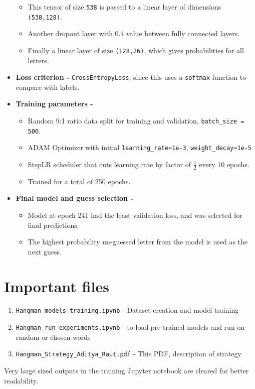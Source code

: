 \documentclass{article}
\begin{document}
\begin{itemize}
\begin{itemize}
		\item This tensor of size \texttt{538} is passed to a linear layer of dimensions \texttt{(538,128)}.
		\item Another dropout layer with 0.4 value between fully connected layers.
		\item Finally a linear layer of size \texttt{(128,26)}, which gives probabilities for all letters.
	\end{itemize}
	\item \textbf{Loss criterion -} \texttt{CrossEntropyLoss}, since this uses a \texttt{softmax} function to compare with labels.
	\item \textbf{Training parameters -}
	\begin{itemize}
		
		\item Random 9:1 ratio data split for training and validation, \texttt{batch\_size = 500}.		
		\item ADAM Optimizer with initial \texttt{learning\_rate=1e-3}, \texttt{weight\_decay=1e-5}
		\item StepLR scheduler that cuts learning rate by factor of $\frac{1}{2}$ every $10$ epochs. 
		\item Trained for a total of 250 epochs.
	\end{itemize}
	\item \textbf{Final model and guess selection -}
	\begin{itemize}
		\item Model at epoch 241 had the least validation loss, and was selected for final predictions.
		\item The highest probability un-guessed letter from the model is used as the next guess.
	\end{itemize}
\end{itemize}

\vspace{-5pt}
\section{Important files}
\begin{enumerate}
	\item \texttt{Hangman\_models\_training.ipynb} - Dataset creation and model training
	\item \texttt{Hangman\_run\_experiments.ipynb} - to load pre-trained models and run on random or chosen words
	\item \texttt{Hangman\_Strategy\_Aditya\_Raut.pdf} - This PDF, description of strategy
\end{enumerate}
Very large sized outputs in the training Jupyter notebook are cleared for better readability.
\end{document}
